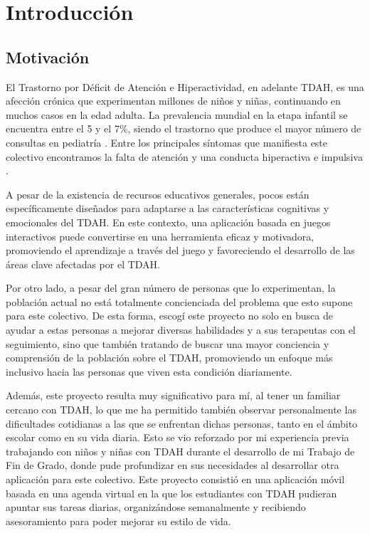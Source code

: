 \section{Introducción}

\subsection{Motivación}
El Trastorno por Déficit de Atención e Hiperactividad, en adelante TDAH, es una afección crónica que experimentan millones de niños y niñas, continuando en muchos casos en la edad adulta. 
La prevalencia mundial en la etapa infantil se encuentra entre el 5 y el 7\%, siendo el trastorno que produce el mayor número de consultas en pediatría \parencite{llanos2019tdah}. 
Entre los principales síntomas que manifiesta este colectivo encontramos la falta de atención y una conducta hiperactiva e impulsiva \parencite{leffa2022adhd}. 

A pesar de la existencia de recursos educativos generales, pocos están específicamente diseñados para adaptarse a las características cognitivas y emocionales del TDAH. 
En este contexto, una aplicación basada en juegos interactivos puede convertirse en una herramienta eficaz y motivadora, promoviendo el aprendizaje a través del juego y favoreciendo el desarrollo de las áreas clave afectadas por el TDAH.

Por otro lado, a pesar del gran número de personas que lo experimentan, la población actual no está totalmente concienciada del problema que esto supone para este colectivo. 
De esta forma, escogí este proyecto no solo en busca de ayudar a estas personas a mejorar diversas habilidades y a sus terapeutas con el seguimiento, sino que también tratando de buscar una mayor conciencia y comprensión de la población sobre el TDAH, promoviendo un enfoque más inclusivo hacia las personas que viven esta condición diariamente.

Además, este proyecto resulta muy significativo para mí, al tener un familiar cercano con TDAH, lo que me ha permitido también observar personalmente las dificultades cotidianas a las que se enfrentan dichas personas, tanto en el ámbito escolar como en su vida diaria. 
Esto se vio reforzado por mi experiencia previa trabajando con niños y  niñas con TDAH durante el desarrollo de mi Trabajo de Fin de Grado, donde pude profundizar en sus necesidades al desarrollar otra aplicación para este colectivo. 
Este proyecto consistió en una aplicación móvil basada en una agenda virtual en la que los estudiantes con TDAH pudieran apuntar sus tareas diarias, organizándose semanalmente y recibiendo asesoramiento para poder mejorar su estilo de vida.

